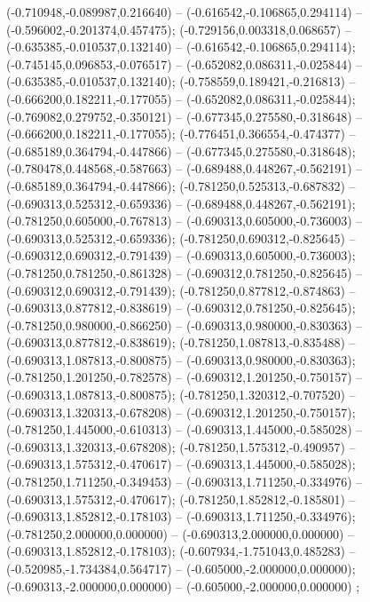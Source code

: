  (-0.710948,-0.089987,0.216640) -- (-0.616542,-0.106865,0.294114) -- (-0.596002,-0.201374,0.457475);
 (-0.729156,0.003318,0.068657) -- (-0.635385,-0.010537,0.132140) -- (-0.616542,-0.106865,0.294114);
 (-0.745145,0.096853,-0.076517) -- (-0.652082,0.086311,-0.025844) -- (-0.635385,-0.010537,0.132140);
 (-0.758559,0.189421,-0.216813) -- (-0.666200,0.182211,-0.177055) -- (-0.652082,0.086311,-0.025844);
 (-0.769082,0.279752,-0.350121) -- (-0.677345,0.275580,-0.318648) -- (-0.666200,0.182211,-0.177055);
 (-0.776451,0.366554,-0.474377) -- (-0.685189,0.364794,-0.447866) -- (-0.677345,0.275580,-0.318648);
 (-0.780478,0.448568,-0.587663) -- (-0.689488,0.448267,-0.562191) -- (-0.685189,0.364794,-0.447866);
 (-0.781250,0.525313,-0.687832) -- (-0.690313,0.525312,-0.659336) -- (-0.689488,0.448267,-0.562191);
 (-0.781250,0.605000,-0.767813) -- (-0.690313,0.605000,-0.736003) -- (-0.690313,0.525312,-0.659336);
 (-0.781250,0.690312,-0.825645) -- (-0.690312,0.690312,-0.791439) -- (-0.690313,0.605000,-0.736003);
 (-0.781250,0.781250,-0.861328) -- (-0.690312,0.781250,-0.825645) -- (-0.690312,0.690312,-0.791439);
 (-0.781250,0.877812,-0.874863) -- (-0.690313,0.877812,-0.838619) -- (-0.690312,0.781250,-0.825645);
 (-0.781250,0.980000,-0.866250) -- (-0.690313,0.980000,-0.830363) -- (-0.690313,0.877812,-0.838619);
 (-0.781250,1.087813,-0.835488) -- (-0.690313,1.087813,-0.800875) -- (-0.690313,0.980000,-0.830363);
 (-0.781250,1.201250,-0.782578) -- (-0.690312,1.201250,-0.750157) -- (-0.690313,1.087813,-0.800875);
 (-0.781250,1.320312,-0.707520) -- (-0.690313,1.320313,-0.678208) -- (-0.690312,1.201250,-0.750157);
 (-0.781250,1.445000,-0.610313) -- (-0.690313,1.445000,-0.585028) -- (-0.690313,1.320313,-0.678208);
 (-0.781250,1.575312,-0.490957) -- (-0.690313,1.575312,-0.470617) -- (-0.690313,1.445000,-0.585028);
 (-0.781250,1.711250,-0.349453) -- (-0.690313,1.711250,-0.334976) -- (-0.690313,1.575312,-0.470617);
 (-0.781250,1.852812,-0.185801) -- (-0.690313,1.852812,-0.178103) -- (-0.690313,1.711250,-0.334976);
 (-0.781250,2.000000,0.000000) -- (-0.690313,2.000000,0.000000) -- (-0.690313,1.852812,-0.178103);
 (-0.607934,-1.751043,0.485283) -- (-0.520985,-1.734384,0.564717) -- (-0.605000,-2.000000,0.000000);
 (-0.690313,-2.000000,0.000000) -- (-0.605000,-2.000000,0.000000) ;
